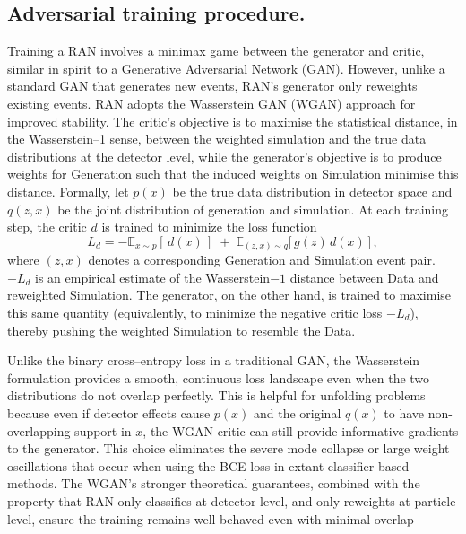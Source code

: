 {{    \subsection{Adversarial training procedure.}
        Training a RAN involves a minimax game between the generator and critic, similar in spirit to a Generative Adversarial Network (GAN).
        However, unlike a standard GAN that generates new events, RAN's generator only reweights existing events.
        RAN adopts the Wasserstein GAN (WGAN) approach for improved stability.
        The critic’s objective is to maximise the statistical distance, in the Wasserstein--1 sense, between the weighted simulation and the true data distributions at the detector level, while the generator’s objective is to produce weights for Generation such that the induced weights on Simulation minimise this distance.
        Formally, let $p(x)$ be the true data distribution in detector space and $q(z, x)$ be the joint distribution of generation and simulation.
        At each training step, the critic $d$ is trained to minimize the loss function
        \[
            L_d = -\mathbb{E}_{x\sim p}[\,d(x)\,]\;+\;\mathbb{E}_{(z, x)\sim q}\big[\,g(z)\,d(x)\,\big]\,,
            \label{eq:wgan_loss}
        \]
        where $(z, x)$ denotes a corresponding Generation and Simulation event pair.
        $-L_d$ is an empirical estimate of the Wasserstein\(-1\) distance between Data and reweighted Simulation.
        The generator, on the other hand, is trained to maximise this same quantity (equivalently, to minimize the negative critic loss $-L_d$), thereby pushing the weighted Simulation to resemble the Data.
        
        Unlike the binary cross--entropy loss in a traditional GAN, the Wasserstein formulation provides a smooth, continuous loss landscape even when the two distributions do not overlap perfectly.
        This is helpful for unfolding problems because even if detector effects cause $p(x)$ and the original $q(x)$ to have non-overlapping support in $x$, the WGAN critic can still provide informative gradients to the generator.
        This choice eliminates the severe mode collapse or large weight oscillations that occur when using the BCE loss in extant classifier based methods.
        The WGAN’s stronger theoretical guarantees, combined with the property that RAN only classifies at detector level, and only reweights at particle level, ensure the training remains well behaved even with minimal overlap~\cite{gulrajani_improved_2017}
        
}}
